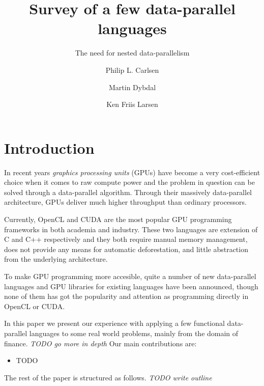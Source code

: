 \documentclass{llncs2e/llncs}
\title{Survey of a few data-parallel languages}
\subtitle{The need for nested data-parallelism} \author{Philip L. Carlsen \and Martin Dybdal \and Ken Friis Larsen}
\institute{University of Copenhagen \\ \email{plcplc@gmail.com,
    dybber@dybber.dk, kflarsen@diku.dk}}
\begin{document}
\maketitle

\section{Introduction}
In recent years \emph{graphics processing units} (GPUs) have become a
very cost-efficient choice when it comes to raw compute power and the
problem in question can be solved through a data-parallel
algorithm. Through their massively data-parallel architecture, GPUs
deliver much higher throughput than ordinary processors.

Currently, OpenCL and CUDA are the most popular GPU programming
frameworks in both academia and industry. These two languages are
extension of C and C++ respectively and they both require manual
memory management, does not provide any means for automatic
deforestation, and little abstraction from the underlying
architecture.

To make GPU programming more accesible, quite a number of new
data-parallel languages and GPU libraries for existing languages
\cite{Catanzaro2011, chakravarty2011accelerating, mainland2010nikola,
  svensson2011obsidian, bergstra2010theano, homepage:rgpu,
  bergstrom2012nested} have been announced, though none of them has
got the popularity and attention as programming directly in OpenCL or
CUDA.

In this paper we present our experience with applying a few functional
data-parallel languages to some real world problems, mainly from the
domain of finance. \emph{TODO go more in depth} Our main contributions
are:
\begin{itemize}
\item TODO
\end{itemize}

The rest of the paper is structured as follows. \emph{TODO write outline}

\end{document}
